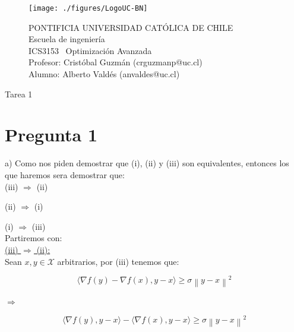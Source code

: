 \documentclass[11pt]{article}
\begin{document}
\begin{figure}
\begin{minipage}{2.5cm}
\texttt{[image: ./figures/LogoUC-BN]}
\end{minipage}
\begin{minipage}{14.5cm}
\vspace{4mm}
{\sc PONTIFICIA UNIVERSIDAD CAT\'OLICA DE CHILE}\\
{\sc Escuela de ingeniería} \\
ICS3153 \ Optimización Avanzada\\
Profesor: Cristóbal Guzmán (crguzmanp@uc.cl) \\
Alumno: Alberto Valdés (anvaldes@uc.cl) \\

\vspace{-8mm}
\hrulefill
\end{minipage}
\end{figure}
\phantom{""}
\vspace{-10mm}
\normalsize

\begin{center}
	\huge{Tarea 1}\\
	\normalsize 
\end{center}

\section*{Pregunta 1}

a) Como nos piden demostrar que (i), (ii) y (iii) son equivalentes, entonces los que haremos sera demostrar que: \\

(iii) $ \Rightarrow $ (ii)

(ii) $ \Rightarrow $ (i)

(i) $ \Rightarrow $ (iii) \\

Partiremos con: \\

\underline{(iii) $ \Rightarrow $ (ii):} \\

Sean $x,y \in \mathcal{X}$ arbitrarios, por (iii) tenemos que:

\[ \langle \nabla f(y) - \nabla f(x), y-x \rangle \geq \sigma \left\| y-x \right\|^{2} \]

$ \Rightarrow $ \

\[ \langle \nabla f(y), y-x \rangle - \langle  \nabla f(x), y-x \rangle  \geq \sigma \left\| y-x \right\|^{2} \]
\end{document}
